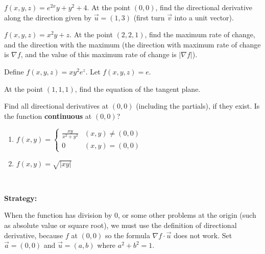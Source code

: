 \documentclass[11pt,fleqn]{book} %
\begin{document}
\begin{enumerate}
\begin{center}
    \end{center}
\end{enumerate}

\begin{exercise}
    $f(x, y, z) = e^{2x}y + y^2 + 4$. At the point $(0, 0)$, find the directional derivative along the direction given by $\vec{u} = (1, 3)$ (first turn $\vec{v}$ into a unit vector). 
\end{exercise}

\begin{exercise}
    $f(x, y, z) = x^2y + z$. At the point $(2, 2, 1)$, find the maximum rate of change, and the direction with the maximum (the direction with maximum rate of change is $\nabla f$, and the value of this maximum rate of change is $| \nabla f |$). 
\end{exercise}

\begin{exercise}
    Define $f(x, y, z) = xy^2e^z$. Let $f(x, y, z) = e$. 

    At the point $(1, 1, 1)$, find the equation of the tangent plane.
\end{exercise}

\begin{exercise}
    Find all directional derivatives at $(0, 0)$ (including the partials), if they exist. Is the function \textbf{continuous} at $(0, 0)$?
    \begin{enumerate}[label=\alph*)]
        \item 
        $f(x, y) = \begin{cases}
            \frac{xy}{x^2 + y^2} & (x, y) \neq (0, 0) \\
            0                    & (x, y) = (0, 0)
        \end{cases}$

        \item $f(x, y) = \sqrt{|xy|}$
    \end{enumerate}

    {~~~}

    \textbf{Strategy:}

    When the function has division by $0$, or some other problems at the origin (such as absolute value or square root), we must use the definition of directional derivative, because $f$  at $(0, 0)$ so the formula $\nabla f \cdot \vec{u}$ does not work. Set $\vec{a} = (0, 0)$ and $\vec{u} = (a, b)$ where $a^2 + b^2 = 1$. 
\end{exercise}
\end{document}
